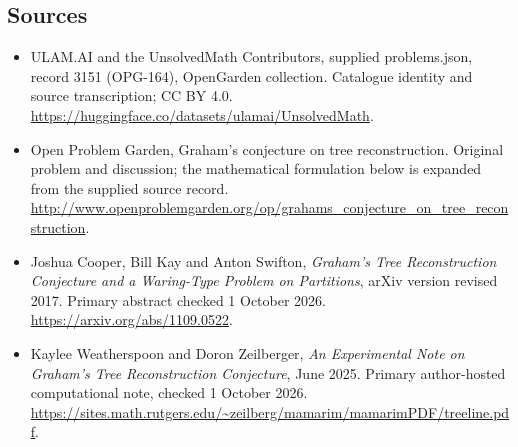 \documentclass[11pt,a4paper]{article}
\begin{document}
\subsection{Sources}
\begin{itemize}
\item[S1] ULAM.AI and the UnsolvedMath Contributors, supplied problems.json, record 3151 (OPG-164), OpenGarden collection. Catalogue identity and source transcription; CC BY 4.0.
\url{https://huggingface.co/datasets/ulamai/UnsolvedMath}.
\item[S2] Open Problem Garden, Graham's conjecture on tree reconstruction. Original problem and discussion; the mathematical formulation below is expanded from the supplied source record.
\url{http://www.openproblemgarden.org/op/grahams_conjecture_on_tree_reconstruction}.

\item[R1] Joshua Cooper, Bill Kay and Anton Swifton,
\emph{Graham's Tree Reconstruction Conjecture and a Waring-Type Problem
on Partitions}, arXiv version revised 2017. Primary abstract checked
1 October 2026.
\url{https://arxiv.org/abs/1109.0522}.
\item[R2] Kaylee Weatherspoon and Doron Zeilberger,
\emph{An Experimental Note on Graham's Tree Reconstruction Conjecture},
June 2025. Primary author-hosted computational note, checked 1 October 2026.
\url{https://sites.math.rutgers.edu/~zeilberg/mamarim/mamarimPDF/treeline.pdf}.

\end{itemize}
\end{document}
